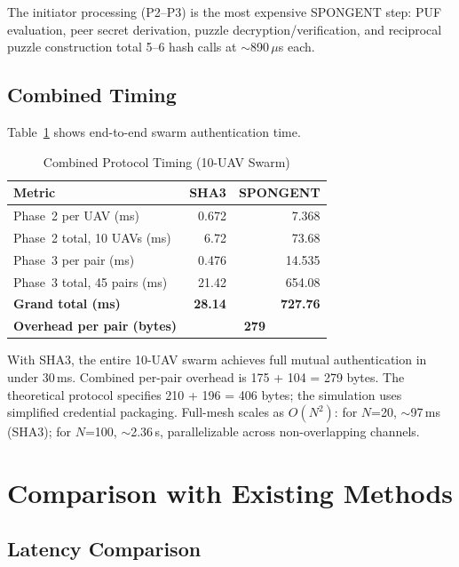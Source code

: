 \documentclass[conference]{IEEEtran}
\begin{document}
The initiator processing (P2--P3) is the most expensive SPONGENT step: PUF evaluation, peer secret derivation, puzzle decryption/verification, and reciprocal puzzle construction total 5--6 hash calls at $\sim$890\,$\mu$s each.

\subsection{Combined Timing}

Table~\ref{tab:combined} shows end-to-end swarm authentication time.

\begin{table}[H]
\centering
\caption{Combined Protocol Timing (10-UAV Swarm)}
\label{tab:combined}
\footnotesize
\begin{tabular}{@{}lrr@{}}
\toprule
\textbf{Metric} & \textbf{SHA3} & \textbf{SPONGENT} \\
\midrule
Phase~2 per UAV (ms) & 0.672 & 7.368 \\
Phase~2 total, 10 UAVs (ms) & 6.72 & 73.68 \\
Phase~3 per pair (ms) & 0.476 & 14.535 \\
Phase~3 total, 45 pairs (ms) & 21.42 & 654.08 \\
\midrule
\textbf{Grand total (ms)} & \textbf{28.14} & \textbf{727.76} \\
\textbf{Overhead per pair (bytes)} & \multicolumn{2}{c}{\textbf{279}} \\
\bottomrule
\end{tabular}
\end{table}

With SHA3, the entire 10-UAV swarm achieves full mutual authentication in under 30\,ms. Combined per-pair overhead is 175 + 104 = 279 bytes. The theoretical protocol specifies 210 + 196 = 406 bytes; the simulation uses simplified credential packaging. Full-mesh scales as $O(N^2)$: for $N$=20, $\sim$97\,ms (SHA3); for $N$=100, $\sim$2.36\,s, parallelizable across non-overlapping channels.

\section{Comparison with Existing Methods}
\label{sec:comparison}

\subsection{Latency Comparison}
\end{document}
